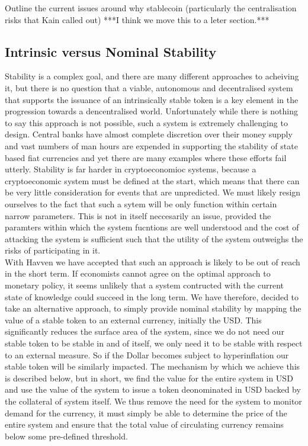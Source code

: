 \documentclass{article}
\begin{document}
\noindent Outline the current issues around why stablecoin (particularly the centralisation risks that Kain called out) ***I think we move this to a leter section.*** \\

\subsection{Intrinsic versus Nominal Stability}

\noindent Stability is a complex goal, and there are many different approaches to acheiving it, but there is no question that a viable, autonomous and decentralised system that supports the issuance of an intrinsically stable token is a key element in the progression towards a dencentralised world. Unfortunately while there is nothing to say this approach is not possible, such a system is extremely challenging to design. Central banks have almost complete discretion over their money supply and vast numbers of man hours are expended in supporting the stability of state based fiat currencies and yet there are many examples where these efforts fail utterly. Stability is far harder in cryptoeconomioc systems, because a cryptoeconomic system must be defined at the start, which means that there can be very little consideration for events that are unpredicted. We must likely resign ourselves to the fact that such a sytem will be only function within certain narrow parameters. This is not in itself neccesarily an issue, provided the paramters within which the system fucntions are well understood and the cost of attacking the system is sufficient such that the utility of the system outweighs the risks of participating in it. \\

\noindent With Havven we have accepted that such an approach is likely to be out of reach in the short term. If economists cannot agree on the optimal approach to monetary policy, it seems unlikely that a system contructed with the current state of knowledge could succeed in the long term. We have therefore, decided to take an alternative approach, to simply provide nominal stability by mapping the value of a stable token to an external currency, initially the USD. This significantly reduces the surface area of the system, since we do not need our stable token to be stable in and of itself, we only need it to be stable with respect to an external measure. So if the Dollar becomes subject to hyperinflation our stable token will be similarly impacted. The mechanism by which we achieve this is described below, but in short, we find the value for the entire system in USD and use the value of the system to issue a token deonominated in USD backed by the collateral of system itself. We thus remove the need for the system to monitor demand for the currency, it must simply be able to determine the price of the entire system and ensure that the total value of circulating currency remains below some pre-defined threshold.\\
\end{document}

